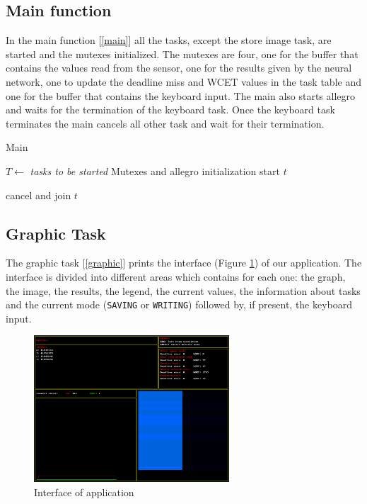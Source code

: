 \documentclass[12pt]{article}
\begin{document}
\subsection{Main function}
In the main function [\ref{main}] all the tasks, except the store image task,
are started and the mutexes initialized. The mutexes are four, one for the
buffer that contains the values read from the sensor, one for the results
given by the neural network, one to update the deadline miss and WCET values
in the task table and one for the buffer that contains the keyboard input. The
main also starts allegro and waits for the termination of the keyboard task.
Once the keyboard task terminates the main cancels all other task and wait
for their termination.

\begin{algorithm}[H]
\caption{Main}
\label{main}

\begin{algorithmic}
\State $T\gets$ \textit{tasks to be started}
\State Mutexes and allegro initialization
    \State start $t$
\EndFor

\Repeat
{}

    \State cancel and join $t$
\EndFor

\end{algorithmic}
\end{algorithm}

\subsection{Graphic Task}

The graphic task [\ref{graphic}] prints the interface (Figure
\ref{interface}) of our application. The interface is divided into different
areas which contains for each one: the graph, the image, the results, the
legend, the current values, the information about tasks and the current
mode (\texttt{SAVING} or \texttt{WRITING}) followed by, if present, the
keyboard input.

\begin{figure}[H]
    \centering
    \includegraphics[width=0.65\textwidth]{images/interface.png}
    \caption{Interface of application}
    \label{interface}
\end{figure}
\end{document}
